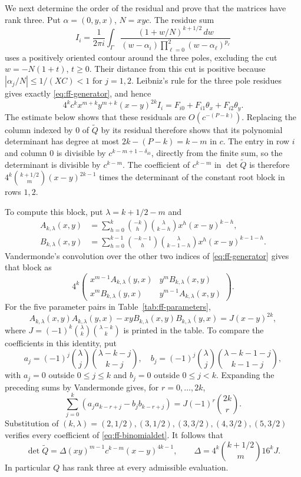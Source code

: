 \documentclass[12pt]{article}
\numberwithin{equation}{section}
\begin{document}
We next determine the order of the residual and prove that the matrices have rank three. Put
$\alpha=(0,y,x)$, $N=xyc$. The residue sum
\begin{equation}\label{eq:ff-residue}
 I_i=\frac1{2\pi i}\int_\Gamma
 \frac{(1+w/N)^{k+1/2}\,dw}
 {(w-\alpha_i)\prod_{\ell=0}^2(w-\alpha_\ell)^{p_\ell}}
\end{equation}
uses a positively oriented contour around the three poles, excluding
the cut $w=-N(1+t)$, $t\ge0$. Their distance from this cut is positive
because $|\alpha_j/N|\le1/(XC)<1$ for $j=1,2$.
Leibniz's rule for the three pole residues gives exactly
\eqref{eq:ff-generator}, and hence
\[
 4^k c^k x^{m+k}y^{m+k}(x-y)^{2k} I_i
 =F_{i0}+F_{i1}\theta_x+F_{i2}\theta_y.
\]
The estimate below shows that these residuals are $O(c^{-(P-k)})$.
Replacing the column indexed by $0$ of $\widetilde Q$ by its residual therefore shows
that its polynomial determinant has degree at most
$2k-(P-k)=k-m$ in $c$. The entry in row $i$ and column $0$ is divisible
by $c^{k-m+1-\delta_{i0}}$, directly from the finite sum, so
the determinant is divisible by $c^{k-m}$. The coefficient of $c^{k-m}$ in $\det\widetilde Q$ is therefore
$4^k\binom{k+1/2}{m}(x-y)^{2k-1}$ times the determinant of the
constant root block in rows $1,2$.

To compute this block, put
$\lambda=k+1/2-m$ and
\begin{align*}
 A_{k,\lambda}(x,y)&=\sum_{h=0}^k
   \binom{-k}{h}\binom{\lambda}{k-h}x^h(x-y)^{k-h},\\
 B_{k,\lambda}(x,y)&=\sum_{h=0}^{k-1}
   \binom{-k-1}{h}\binom{\lambda}{k-1-h}x^h(x-y)^{k-1-h}.
\end{align*}
Vandermonde's convolution over the other two indices of
\eqref{eq:ff-generator} gives that block as
\[
 4^k\begin{pmatrix}
 x^{m-1}A_{k,\lambda}(y,x)&y^mB_{k,\lambda}(x,y)\\
 x^mB_{k,\lambda}(y,x)&y^{m-1}A_{k,\lambda}(x,y)
 \end{pmatrix}.
\]
For the five parameter pairs in Table~\ref{tab:ff-parameters},
\begin{equation}\label{eq:ff-binomialdet}
 A_{k,\lambda}(x,y)A_{k,\lambda}(y,x)
 -xyB_{k,\lambda}(x,y)B_{k,\lambda}(y,x)
 =J(x-y)^{2k},
\end{equation}
where $J=(-1)^k\binom\lambda k\binom{\lambda-k}k$ is printed in the
table. To compare the coefficients in this identity, put
\[
 a_j=(-1)^j\binom\lambda j\binom{\lambda-k-j}{k-j},\quad
 b_j=(-1)^j\binom\lambda j\binom{\lambda-k-1-j}{k-1-j},
\]
with $a_j=0$ outside $0\le j\le k$ and $b_j=0$ outside
$0\le j<k$. Expanding the preceding sums by Vandermonde gives,
for $r=0,\ldots,2k$,
\[
 \sum_{j=0}^k(a_ja_{k-r+j}-b_jb_{k-r+j})
 =J(-1)^r\binom{2k}{r}.
\]
Substitution of $(k,\lambda)=(2,1/2),(3,1/2),(3,3/2),
(4,3/2),(5,3/2)$ verifies every coefficient of
\eqref{eq:ff-binomialdet}. It follows that
\begin{equation}\label{eq:ff-two-det}
 \det \widetilde Q=\Delta(xy)^{m-1}c^{k-m}(x-y)^{4k-1},\qquad
 \Delta=4^k\binom{k+1/2}{m}16^kJ.
\end{equation}
In particular $Q$ has rank three at every admissible evaluation.
\end{document}
